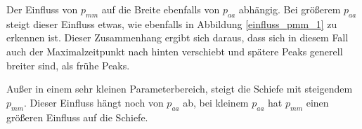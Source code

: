 Der Einfluss von $p_{mm}$ auf die Breite ebenfalls von $p_{aa}$ abhängig. Bei größerem $p_{aa}$ steigt dieser Einfluss etwas, wie ebenfalls in Abbildung \ref{einfluss_pmm_1} zu erkennen ist. Dieser Zusammenhang ergibt sich daraus, dass sich in diesem Fall auch der Maximalzeitpunkt nach hinten verschiebt und spätere Peaks generell breiter sind, als frühe Peaks.


Außer in einem sehr kleinen Parameterbereich, steigt die Schiefe mit steigendem $p_{mm}$. Dieser Einfluss hängt noch von $p_{aa}$ ab, bei kleinem $p_{aa}$ hat $p_{mm}$ einen größeren Einfluss auf die Schiefe.

